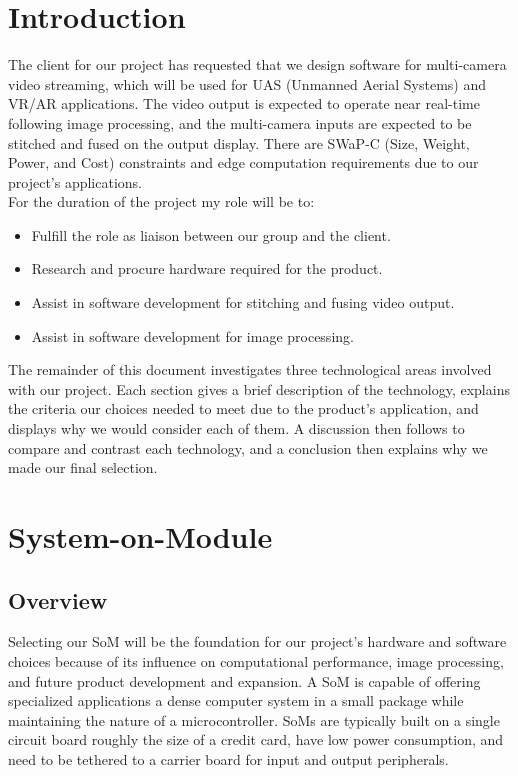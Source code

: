 \section{Introduction}

The client for our project has requested that we design software for multi-camera video 
streaming, which will be used for UAS (Unmanned Aerial Systems) and VR/AR applications. 
The video output is expected to operate near real-time following image processing, and the multi-camera inputs are 
expected to be stitched and fused on the output display. There are SWaP-C (Size, Weight, Power,
and Cost) constraints and edge computation requirements due to our project's applications. \\

For the duration of the project my role will be to:
\begin{itemize}
	\itemsep-2em
	\item Fulfill the role as liaison between our group and the client. \\
	\item Research and procure hardware required for the product. \\
	\item Assist in software development for stitching and fusing video output. \\
	\item Assist in software development for image processing. \\
\end{itemize}

The remainder of this document investigates three technological areas involved with 
our project. Each section gives a brief description of the technology, explains the 
criteria our choices needed to meet due to the product's application, and displays why 
we would consider each of them. A discussion then follows to compare and contrast each 
technology, and a conclusion then explains why we made our final selection.\\

\section{System-on-Module}

\subsection{Overview}

Selecting our SoM will be the foundation for our project's hardware 
and software choices because of its influence on computational performance, image 
processing, and future product development and expansion. A SoM is capable of offering 
specialized applications a dense computer system in a small package while
maintaining the nature of a microcontroller. SoMs are typically built on a single 
circuit board roughly the size of a credit card, have low power consumption, and 
need to be tethered to a carrier board for input and output peripherals.\\


